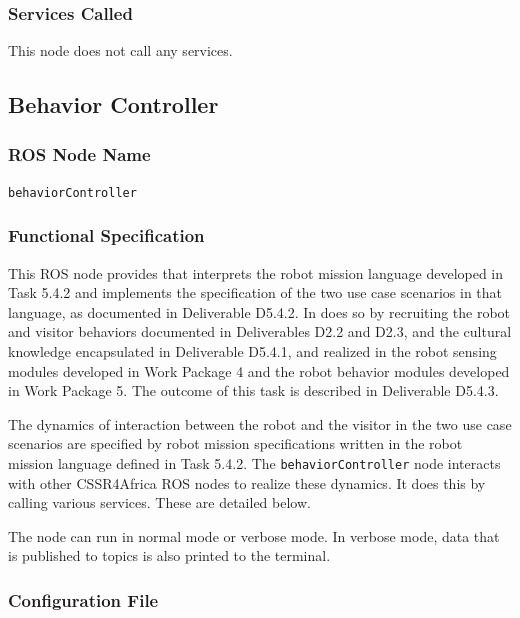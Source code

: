 \documentclass{CSSRforAfrica}
\begin{document}
\subsubsection*{Services Called}
This node does not call any services.



\newpage

\subsection{Behavior Controller}
\label{section:behavior_controller}

\subsubsection*{ROS Node Name}
 {\small \verb+behaviorController+}   

\subsubsection*{Functional Specification}
This ROS node  provides that interprets the robot mission language developed in Task 5.4.2 and implements the specification of the two  use case scenarios in that language, as documented in Deliverable D5.4.2. In does so by  recruiting the robot and visitor behaviors documented in Deliverables D2.2 and D2.3, and the cultural knowledge encapsulated in Deliverable D5.4.1, and realized in the robot sensing modules developed in Work Package 4 and the robot behavior modules developed in Work Package 5.  The outcome of this task  is described in Deliverable D5.4.3. 

The dynamics of interaction between the robot and the visitor in the two use case scenarios are specified by robot mission specifications  written in the robot mission language defined in Task 5.4.2.  The  {\small \verb+behaviorController+}  node interacts with other CSSR4Africa ROS nodes to realize these dynamics.  It does this by calling various services. These are detailed below.

The node can run in normal mode or verbose mode. In verbose mode, data that is published to topics is also printed to the terminal.

\subsubsection*{Configuration File}
\end{document}
